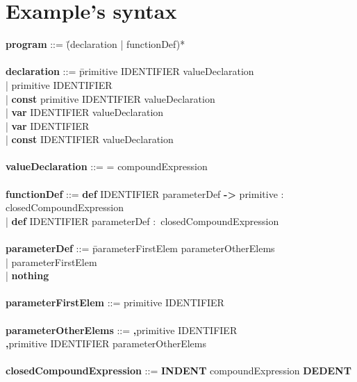 \section{Example's syntax}
\begin{tabbing}

{\bf program}                     ::= \=(declaration | functionDef)*\\
\\
{\bf declaration}                 ::= \=primitive IDENTIFIER valueDeclaration\\
                                      \>| primitive IDENTIFIER\\
                                      \>| \textbf{const} primitive IDENTIFIER valueDeclaration\\
                                      \>| \textbf{var} IDENTIFIER valueDeclaration\\
                                      \>| \textbf{var} IDENTIFIER\\
                                      \>| \textbf{const} IDENTIFIER valueDeclaration\\
\\
{\bf valueDeclaration}            ::= = compoundExpression\\
\\
{\bf functionDef}                 ::= \= \textbf{def} IDENTIFIER parameterDef \textbf{->} primitive \textbf{$\colon$} closedCompoundExpression\\
                                      \>| \textbf{def} IDENTIFIER parameterDef \textbf{$\colon$} closedCompoundExpression\\
\\
{\bf parameterDef}                ::= \=parameterFirstElem parameterOtherElems\\
                                      \>| parameterFirstElem\\
                                      \>| \textbf{nothing}\\
\\
{\bf parameterFirstElem}          ::= primitive IDENTIFIER\\
\\
{\bf parameterOtherElems}         ::= \=\textbf{,}primitive IDENTIFIER\\
                                      \>\textbf{,}primitive IDENTIFIER parameterOtherElems\\  
\\
{\bf closedCompoundExpression}    ::= \textbf{INDENT} compoundExpression \textbf{DEDENT}\\

\end{tabbing}
